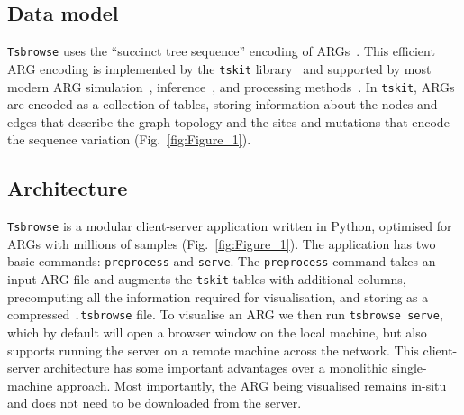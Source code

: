 \documentclass[unnumsec,webpdf,contemporary,large,namedate]{oup-authoring-template}%
\begin{document}
\subsection{Data model} \label{subsec:Data_Model} 
\texttt{Tsbrowse} uses the ``succinct tree sequence'' encoding of 
ARGs~\citep{wong2024general}. This efficient ARG encoding 
is implemented by the 
\texttt{tskit} library~\citep{ralph2020efficiently}
and supported by most modern ARG
simulation~\citep{kelleher2016efficient,kelleher2018efficient,
    haller2019tree,baumdicker2022efficient,
    adrion2020community,lauterbur2023expanding,korfmann2023weak,
    tsambos2023link,tagami2024tstrait},
inference~\citep{kelleher2019inferring,speidel2019method,wohns2022unified,
    mahmoudi2022bayesian,zhan2023towards,zhang2023biobank,deng2025general},
and processing methods~\citep{fan2022genealogical,nowbandegani2023extremely}.
In \texttt{tskit}, ARGs are encoded as a
collection of tables, storing information about the
nodes and edges that describe the graph topology and the sites
and mutations that encode the sequence variation (Fig.~\ref{fig:Figure_1}).

\subsection{Architecture}
\texttt{Tsbrowse} is a modular client-server application
written in Python, optimised for ARGs with millions
of samples (Fig.~\ref{fig:Figure_1}).
The application has two basic commands: \texttt{preprocess}
and \texttt{serve}. The \texttt{preprocess} command
takes an input ARG file and augments the \texttt{tskit}
tables with additional columns,
precomputing all the information required for visualisation,
and storing as a compressed \texttt{.tsbrowse} file.
To visualise an ARG we then run \texttt{tsbrowse serve}, which
by default will open a browser window on the local machine, but
also supports running the server on a remote machine across the
network.
This client-server architecture has some important advantages over
a monolithic single-machine approach. Most importantly,
the ARG being visualised remains in-situ and does not need to be
downloaded from the server.
\end{document}
